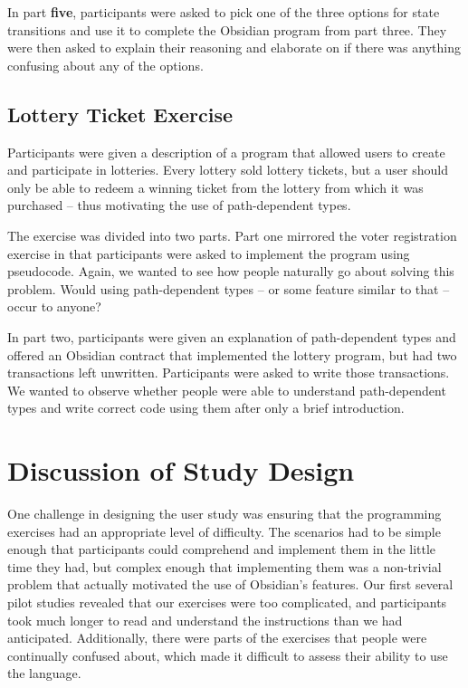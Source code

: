\documentclass[sigplan,10pt,review]{acmart}\settopmatter{printfolios=true}
\begin{document}
In part \textbf{five}, participants were asked to pick one of the three options for state transitions and use it to complete 
the Obsidian program from part three. They were then asked to explain their reasoning and elaborate on if 
there was anything confusing about any of the options. 

\subsection{Lottery Ticket Exercise}
	
Participants were given a description of a program that allowed users to create and participate in lotteries. Every 
lottery sold lottery tickets, but a user should only be able to redeem a winning ticket from the lottery from which it was purchased
 -- thus motivating the use of path-dependent types. 

The exercise was divided into two parts. Part one mirrored the voter registration exercise in that participants were 
asked to implement the program using pseudocode. Again, we wanted to see how people naturally go about 
solving this problem. Would using path-dependent types -- or some feature similar to that -- occur to anyone?
	
In part two, participants were given an explanation of path-dependent types and offered an Obsidian contract that 
implemented the lottery program, but had two transactions left unwritten. Participants were asked to write 
those transactions. We wanted to observe whether people were able to understand path-dependent types and write 
correct code using them after only a brief introduction. 

\section{Discussion of Study Design}

One challenge in designing the user study was ensuring that the programming exercises had an appropriate level of difficulty. The 
scenarios had to be simple enough that participants could comprehend and implement them in the little time they had, but 
 complex enough that implementing them was a non-trivial problem that actually motivated the use of 
Obsidian's features. Our first several pilot studies revealed that our exercises were too complicated, and 
participants took much longer to read and understand the instructions than we had anticipated. Additionally, there were parts 
of the exercises that people were continually confused about, which made it difficult to assess their ability to use the language. 
\end{document}
